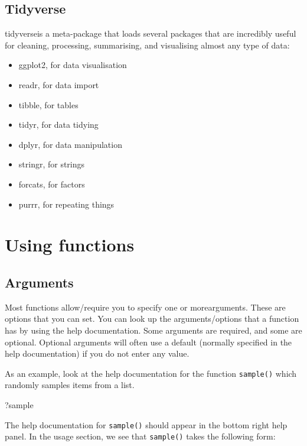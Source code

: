 \documentclass[
  oneside]{book}
\newenvironment{Shaded}{\begin{snugshade}}{\end{snugshade}}
\newcommand{\NormalTok}[1]{#1}
\providecommand{\tightlist}{%
  \setlength{\itemsep}{0pt}\setlength{\parskip}{0pt}}
\begin{document}
\subsection{Tidyverse}\label{tidyverse}

tidyverseis a meta-package that loads several packages that are incredibly useful for cleaning, processing, summarising, and visualising almost any type of data:

\begin{itemize}
\tightlist
\item
  ggplot2, for data visualisation
\item
  readr, for data import
\item
  tibble, for tables
\item
  tidyr, for data tidying
\item
  dplyr, for data manipulation
\item
  stringr, for strings{}
\item
  forcats, for factors{}
\item
  purrr, for repeating things
\end{itemize}

\section{Using functions}\label{using-functions}

\subsection{Arguments}\label{arguments}

Most functions allow/require you to specify one or morearguments{}. These are options that you can set. You can look up the arguments/options that a function has by using the help documentation. Some arguments are required, and some are optional. Optional arguments will often use a default (normally specified in the help documentation) if you do not enter any value.

As an example, look at the help documentation for the function \texttt{sample()} which randomly samples items from a list.

\begin{Shaded}
\begin{Highlighting}[]
\NormalTok{?sample}
\end{Highlighting}
\end{Shaded}

The help documentation for \texttt{sample()} should appear in the bottom right help panel. In the usage section, we see that \texttt{sample()} takes the following form:
\end{document}
